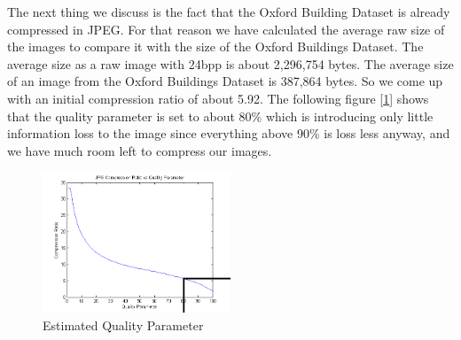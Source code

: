 \documentclass[10pt,a4paper,twocolumn]{article}
\begin{document}
The next thing we discuss is the fact that the Oxford Building Dataset is already compressed in JPEG. For that reason we have calculated the average raw size of the images to compare it with the size of the Oxford Buildings Dataset. The average size as a raw image with 24bpp is about 2,296,754 bytes. The average size of an image from the Oxford Buildings Dataset is 387,864 bytes. So we come up with an initial compression ratio of about 5.92. The following figure [\ref{fig:jpg_ratio}] shows that the quality parameter is set to about 80\% which is introducing only little information loss to the image since everything above 90\% is loss less anyway, and we have much room left to compress our images.
\begin{figure}
	\includegraphics[width=0.5\textwidth]{img/jpg-ratio.png}
	\caption{Estimated Quality Parameter}
  \label{fig:jpg_ratio}
\end{figure}
\end{document}
